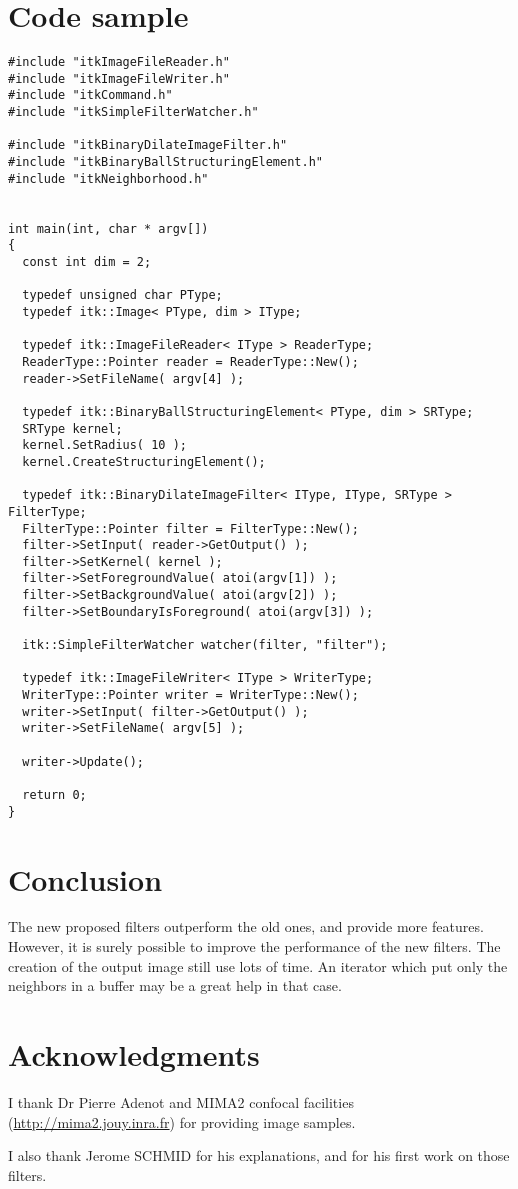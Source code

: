 \documentclass{InsightArticle}
\begin{document}
\section{Code sample}

\small \begin{verbatim}
#include "itkImageFileReader.h"
#include "itkImageFileWriter.h"
#include "itkCommand.h"
#include "itkSimpleFilterWatcher.h"

#include "itkBinaryDilateImageFilter.h"
#include "itkBinaryBallStructuringElement.h"
#include "itkNeighborhood.h"


int main(int, char * argv[])
{
  const int dim = 2;
  
  typedef unsigned char PType;
  typedef itk::Image< PType, dim > IType;

  typedef itk::ImageFileReader< IType > ReaderType;
  ReaderType::Pointer reader = ReaderType::New();
  reader->SetFileName( argv[4] );

  typedef itk::BinaryBallStructuringElement< PType, dim > SRType;
  SRType kernel;
  kernel.SetRadius( 10 );
  kernel.CreateStructuringElement();

  typedef itk::BinaryDilateImageFilter< IType, IType, SRType > FilterType;
  FilterType::Pointer filter = FilterType::New();
  filter->SetInput( reader->GetOutput() );
  filter->SetKernel( kernel );
  filter->SetForegroundValue( atoi(argv[1]) );
  filter->SetBackgroundValue( atoi(argv[2]) );
  filter->SetBoundaryIsForeground( atoi(argv[3]) );

  itk::SimpleFilterWatcher watcher(filter, "filter");

  typedef itk::ImageFileWriter< IType > WriterType;
  WriterType::Pointer writer = WriterType::New();
  writer->SetInput( filter->GetOutput() );
  writer->SetFileName( argv[5] );

  writer->Update();

  return 0;
}
\end{verbatim} \normalsize

\section{Conclusion}
The new proposed filters outperform the old ones, and provide more features.
However, it is surely possible to improve the performance of the new filters.
The creation of the output image still use lots of time. An iterator which
put only the neighbors in a buffer may be a great help in that case.


\section{Acknowledgments}
I thank Dr Pierre Adenot and MIMA2 confocal facilities
(\url{http://mima2.jouy.inra.fr}) for providing image samples.

I also thank Jerome SCHMID for his explanations, and for his first work
on those filters.


\appendix





\nocite{ITKSoftwareGuide}
\end{document}
